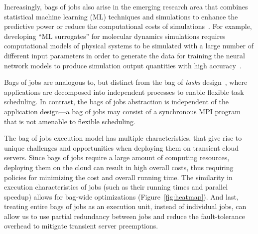 Increasingly, bags of jobs also arise in the emerging research area that combines statistical machine learning (ML) techniques and simulations to enhance the predictive power or reduce the
computational costs of simulations~\cite{ferguson2017machine,wang2019machine,casalino2021ai,moradzadeh2019molecular,kadupitiya2020machine,kadupitiya2020machine2}. %
For example, developing ``ML surrogates'' for molecular dynamics simulations requires computational models of physical systems to be simulated with a large number of different input parameters in order to generate the data for training the neural network models to produce simulation output quantities with high accuracy~\cite{kadupitiya2020machine2}. 



Bags of jobs are analogous to, but distinct from the bag of \emph{tasks} design~\cite{bot-2003}, where applications are decomposed into independent processes to enable flexible task scheduling. 
In contrast, the bags of jobs abstraction is independent of the application design---a bag of jobs may consist of a synchronous MPI program that is not amenable to flexible scheduling. 




The bag of jobs execution model has multiple characteristics, that give rise to unique challenges and opportunities when deploying them on transient cloud servers. 
Since bags of jobs require a large amount of computing resources, deploying them on the cloud can result in high overall costs, thus requiring policies for minimizing the cost and overall running time. 
The similarity in execution characteristics of jobs (such as their running times and parallel speedup) allows for bag-wide optimizations (Figure~\ref{fig:heatmap}). 
And last, treating entire bags of jobs as an execution unit, instead of individual jobs, can allow us to use partial redundancy between jobs and reduce the fault-tolerance overhead to mitigate transient server preemptions. 



